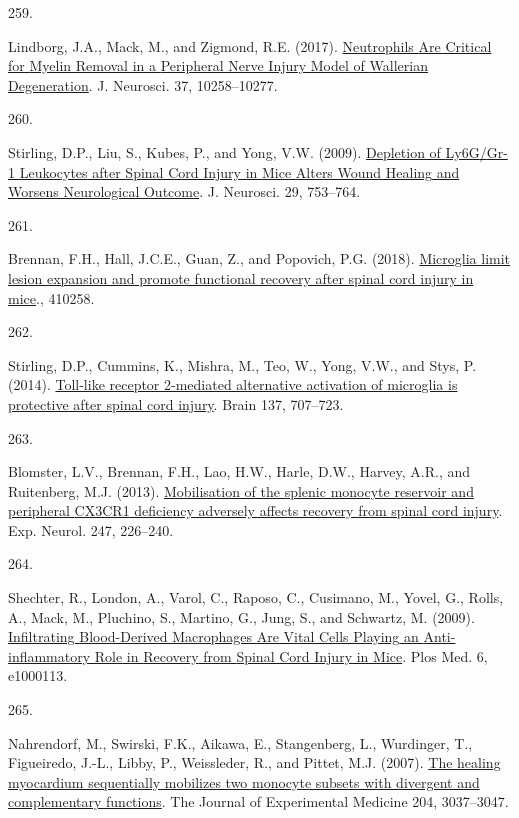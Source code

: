 \documentclass[
]{article}
\newlength{\cslhangindent}
\newlength{\csllabelwidth}
\newlength{\cslentryspacingunit} %
\newenvironment{CSLReferences}[2] %
 {%
  \setlength{\parindent}{0pt}
  \ifodd #1
  \let\oldpar\par
  \def\par{\hangindent=\cslhangindent\oldpar}
  \fi
  \setlength{\parskip}{#2\cslentryspacingunit}
 }%
 {}
\newcommand{\CSLLeftMargin}[1]{\parbox[t]{\csllabelwidth}{#1}}
\newcommand{\CSLRightInline}[1]{\parbox[t]{\linewidth - \csllabelwidth}{#1}\break}
\begin{document}
\begin{CSLReferences}{0}{0}
\leavevmode{}%
\CSLLeftMargin{259. }
\CSLRightInline{Lindborg, J.A., Mack, M., and Zigmond, R.E. (2017). \href{https://doi.org/10.1523/JNEUROSCI.2085-17.2017}{Neutrophils {Are Critical} for {Myelin Removal} in a {Peripheral Nerve Injury Model} of {Wallerian Degeneration}}. J. Neurosci. 37, 10258--10277.}

\leavevmode{}%
\CSLLeftMargin{260. }
\CSLRightInline{Stirling, D.P., Liu, S., Kubes, P., and Yong, V.W. (2009). \href{https://doi.org/10.1523/JNEUROSCI.4918-08.2009}{Depletion of {Ly6G}/{Gr-1 Leukocytes} after {Spinal Cord Injury} in {Mice Alters Wound Healing} and {Worsens Neurological Outcome}}. J. Neurosci. 29, 753--764.}

\leavevmode{}%
\CSLLeftMargin{261. }
\CSLRightInline{Brennan, F.H., Hall, J.C.E., Guan, Z., and Popovich, P.G. (2018). \href{https://doi.org/10.1101/410258}{Microglia limit lesion expansion and promote functional recovery after spinal cord injury in mice}., 410258.}

\leavevmode{}%
\CSLLeftMargin{262. }
\CSLRightInline{Stirling, D.P., Cummins, K., Mishra, M., Teo, W., Yong, V.W., and Stys, P. (2014). \href{https://doi.org/10.1093/brain/awt341}{Toll-like receptor 2-mediated alternative activation of microglia is protective after spinal cord injury}. Brain 137, 707--723.}

\leavevmode{}%
\CSLLeftMargin{263. }
\CSLRightInline{Blomster, L.V., Brennan, F.H., Lao, H.W., Harle, D.W., Harvey, A.R., and Ruitenberg, M.J. (2013). \href{https://doi.org/10.1016/j.expneurol.2013.05.002}{Mobilisation of the splenic monocyte reservoir and peripheral {CX3CR1} deficiency adversely affects recovery from spinal cord injury}. Exp. Neurol. 247, 226--240.}

\leavevmode{}%
\CSLLeftMargin{264. }
\CSLRightInline{Shechter, R., London, A., Varol, C., Raposo, C., Cusimano, M., Yovel, G., Rolls, A., Mack, M., Pluchino, S., Martino, G., Jung, S., and Schwartz, M. (2009). \href{https://doi.org/10.1371/journal.pmed.1000113}{Infiltrating {Blood-Derived Macrophages Are Vital Cells Playing} an {Anti-inflammatory Role} in {Recovery} from {Spinal Cord Injury} in {Mice}}. Plos Med. 6, e1000113.}

\leavevmode{}%
\CSLLeftMargin{265. }
\CSLRightInline{Nahrendorf, M., Swirski, F.K., Aikawa, E., Stangenberg, L., Wurdinger, T., Figueiredo, J.-L., Libby, P., Weissleder, R., and Pittet, M.J. (2007). \href{https://doi.org/10.1084/jem.20070885}{The healing myocardium sequentially mobilizes two monocyte subsets with divergent and complementary functions}. The Journal of Experimental Medicine 204, 3037--3047.}


\end{CSLReferences}
\end{document}

